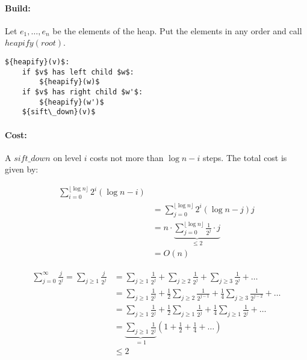 \paragraph{Build: } Let $e_1, \ldots, e_n$ be the elements of the heap. Put the elements in any order and call ${heapify}({root})$.
\begin{lstlisting}[mathescape]
${heapify}(v)$:
    if $v$ has left child $w$:
        ${heapify}(w)$
    if $v$ has right child $w'$:
        ${heapify}(w')$
    ${sift\_down}(v)$
\end{lstlisting}

\paragraph{Cost: } A ${sift\_down}$ on level $i$ costs not more than $\log n -i$ steps. The total cost is given by:

\begin{align*}
\sum_{i = 0}^{\lfloor \log n \rfloor} 2^i (\log n - i) \\
& = \sum_{j = 0}^{\lfloor \log n \rfloor} 2^i (\log n - j) j \\
& = n \cdot \underbrace{\sum_{j = 0}^{\lfloor \log n \rfloor} \frac{1}{2^j} \cdot j}_{\le 2} \\
& = O(n)
\end{align*}

\begin{align*}
\sum_{j=0}^\infty \frac{j}{2^j} = \sum_{j \ge 1} \frac{j}{2^j} & = \sum_{j \ge 1} \frac{1}{2^j} + \sum_{j \ge 2} \frac{1}{2^j} + \sum_{j \ge 3} \frac{1}{2^j} + \ldots  \\
& = \sum_{j \ge 1} \frac{1}{2^j} + \frac{1}{2} \sum_{j \ge 2} \frac{1}{2^{j-1}} + \frac{1}{4} \sum_{j \ge 3} \frac{1}{2^{j-2}} + \ldots \\
& = \sum_{j \ge 1} \frac{1}{2^j} + \frac{1}{2} \sum_{j \ge 1} \frac{1}{2^j} + \frac{1}{4} \sum_{j \ge 1} \frac{1}{2^j} + \ldots \\
& = \underbrace{\sum_{j \ge 1} \frac{1}{2^j}}_{=1} \left ( 1 + \frac{1}{2} + \frac{1}{4} + \ldots \right ) \\
& \le 2
\end{align*}


